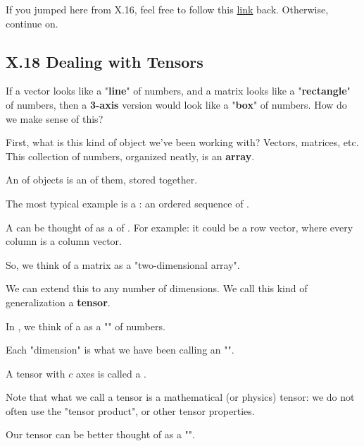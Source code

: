         If you jumped here from X.16, feel free to follow this \hyperref[X.16]{link} back. Otherwise, continue on.
    
    \secdiv
    
    \subsection*{X.18 \quad Dealing with Tensors}
    
        If a vector looks like a "\textbf{line}" of numbers, and a matrix looks like a "\textbf{rectangle}" of numbers, then a \textbf{3-axis} version would look like a "\textbf{box}" of numbers. How do we make sense of this?
        
        First, what is this kind of object we've been working with? Vectors, matrices, etc. This collection of numbers, organized neatly, is an \textbf{array}.\\
        
        \begin{definition}
            An  of objects is an  of them, stored together. 
            
            The most typical example is a : an ordered sequence of .
            
            A  can be thought of as a  of . For example: it could be a row vector, where every column is a column vector. 
            
            So, we think of a matrix as a "two-dimensional array". 
        \end{definition}
        
        We can extend this to any number of dimensions. We call this kind of generalization a \textbf{tensor}.\\
        
        \begin{definition}
            In , we think of a  as a "" of numbers.
            
            Each "dimension" is what we have been calling an "".
            
            A tensor with $c$ axes is called a .
            
            Note that what we call a tensor is  a mathematical (or physics) tensor: we do not often use the "tensor product", or other tensor properties. 
            
            Our tensor can be better thought of as a "".
        \end{definition}
        

